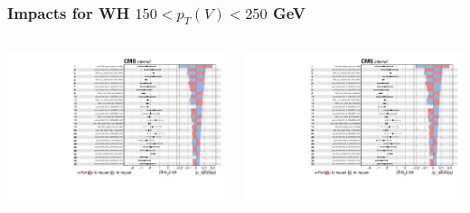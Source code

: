 \documentclass{beamer}
\begin{document}
\begin{frame}
  \frametitle{Impacts for WH $150 < p_T(V) < 250$ GeV}
  \centering
  \begin{columns}
    \begin{column}{0.5\linewidth}
      \includegraphics[width=0.85\linewidth,page=1]{figures/impacts/impacts_r_whmed.pdf}
    \end{column}
    \begin{column}{0.5\linewidth}
      \includegraphics[width=0.85\linewidth,page=2]{figures/impacts/impacts_r_whmed.pdf}
    \end{column}
  \end{columns}
\end{frame}
\end{document}
